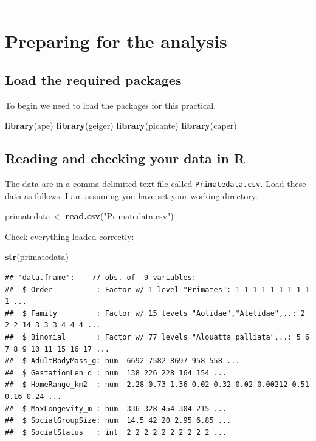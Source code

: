 \documentclass[]{book}
\newenvironment{Shaded}{\begin{snugshade}}{\end{snugshade}}
\newcommand{\KeywordTok}[1]{\textcolor[rgb]{0.13,0.29,0.53}{\textbf{{#1}}}}
\newcommand{\StringTok}[1]{\textcolor[rgb]{0.31,0.60,0.02}{{#1}}}
\newcommand{\NormalTok}[1]{{#1}}
\begin{document}
\begin{center}\rule{0.5\linewidth}{\linethickness}\end{center}

\section{Preparing for the analysis}\label{preparing-for-the-analysis}

\subsection{Load the required
packages}\label{load-the-required-packages}

To begin we need to load the packages for this practical.

\begin{Shaded}
\begin{Highlighting}[]
\KeywordTok{library}\NormalTok{(ape)}
\KeywordTok{library}\NormalTok{(geiger)}
\KeywordTok{library}\NormalTok{(picante)}
\KeywordTok{library}\NormalTok{(caper)}
\end{Highlighting}
\end{Shaded}

\subsection{Reading and checking your data in
R}\label{reading-and-checking-your-data-in-r}

The data are in a comma-delimited text file called
\texttt{Primatedata.csv}. Load these data as follows. I am assuming you
have set your working directory.

\begin{Shaded}
\begin{Highlighting}[]
\NormalTok{primatedata <-}\StringTok{ }\KeywordTok{read.csv}\NormalTok{(}\StringTok{"Primatedata.csv"}\NormalTok{)}
\end{Highlighting}
\end{Shaded}

Check everything loaded correctly:

\begin{Shaded}
\begin{Highlighting}[]
\KeywordTok{str}\NormalTok{(primatedata)}
\end{Highlighting}
\end{Shaded}

\begin{verbatim}
## 'data.frame':    77 obs. of  9 variables:
##  $ Order          : Factor w/ 1 level "Primates": 1 1 1 1 1 1 1 1 1 1 ...
##  $ Family         : Factor w/ 15 levels "Aotidae","Atelidae",..: 2 2 2 14 3 3 3 4 4 4 ...
##  $ Binomial       : Factor w/ 77 levels "Alouatta palliata",..: 5 6 7 8 9 10 11 15 16 17 ...
##  $ AdultBodyMass_g: num  6692 7582 8697 958 558 ...
##  $ GestationLen_d : num  138 226 228 164 154 ...
##  $ HomeRange_km2  : num  2.28 0.73 1.36 0.02 0.32 0.02 0.00212 0.51 0.16 0.24 ...
##  $ MaxLongevity_m : num  336 328 454 304 215 ...
##  $ SocialGroupSize: num  14.5 42 20 2.95 6.85 ...
##  $ SocialStatus   : int  2 2 2 2 2 2 2 2 2 2 ...
\end{verbatim}
\end{document}
